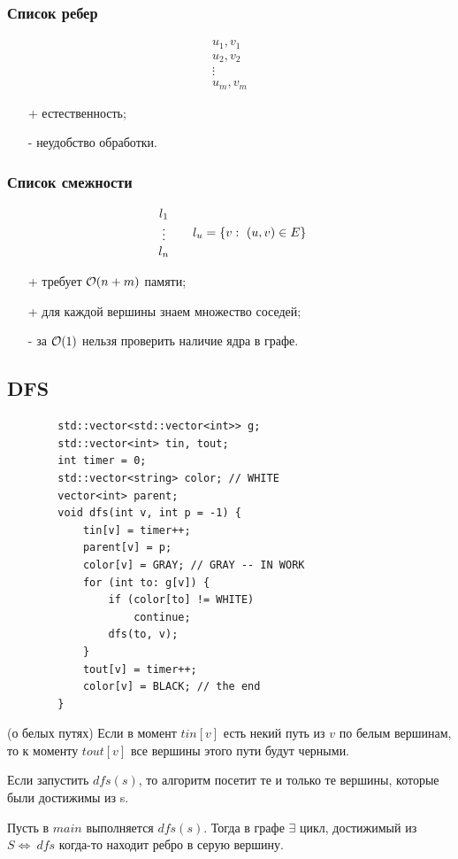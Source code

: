 \begin{multicols}{2}
    \subsubsection*{Список ребер}
    \[
        \begin{array}{l}
            u_1, v_1\\ 
            u_2, v_2\\
            \vdots\\
            u_m, v_m           
        \end{array}
    \]
    \begin{itemize}
        \item[+] естественность;
        \item[-] неудобство обработки. 
    \end{itemize}
    \subsubsection*{Список смежности}
    \useshortskip
    \[
        \begin{array}{c}
            l_1\\
            \vdots\\
            l_n
        \end{array} \hspace*{0.5cm} l_u = \{v: \ (u, v) \in E\}
    \]
    \begin{itemize}
        \item[+] требует ${\cal O}(n+m)$ памяти;
        \item[+] для каждой вершины знаем множество соседей;
        \item[-] за ${\cal O}(1)$ нельзя проверить наличие ядра в графе.  
    \end{itemize}
    \subsection*{DFS}
    \begin{lstlisting}
        std::vector<std::vector<int>> g;
        std::vector<int> tin, tout;
        int timer = 0;
        std::vector<string> color; // WHITE
        vector<int> parent;
        void dfs(int v, int p = -1) {
            tin[v] = timer++;
            parent[v] = p;
            color[v] = GRAY; // GRAY -- IN WORK
            for (int to: g[v]) {
                if (color[to] != WHITE) 
                    continue;
                dfs(to, v);
            }
            tout[v] = timer++;
            color[v] = BLACK; // the end
        }
    \end{lstlisting}
    \begin{lemma}{(о белых путях)}{}
        Если в момент $tin[v]$ есть некий путь из $v$ по белым вершинам, то к моменту $tout[v]$ все вершины этого пути будут черными.
    \end{lemma}
    \cons Если запустить $dfs(s)$, то алгоритм посетит те и только те вершины, которые были достижимы из s.
    \par
    \cons Пусть в $main$ выполняется $dfs(s)$. Тогда в графе $\exists$ цикл, достижимый из $S \Leftrightarrow \ dfs$ когда-то находит ребро в серую вершину.  \vspace*{0.5cm}


\end{multicols}
